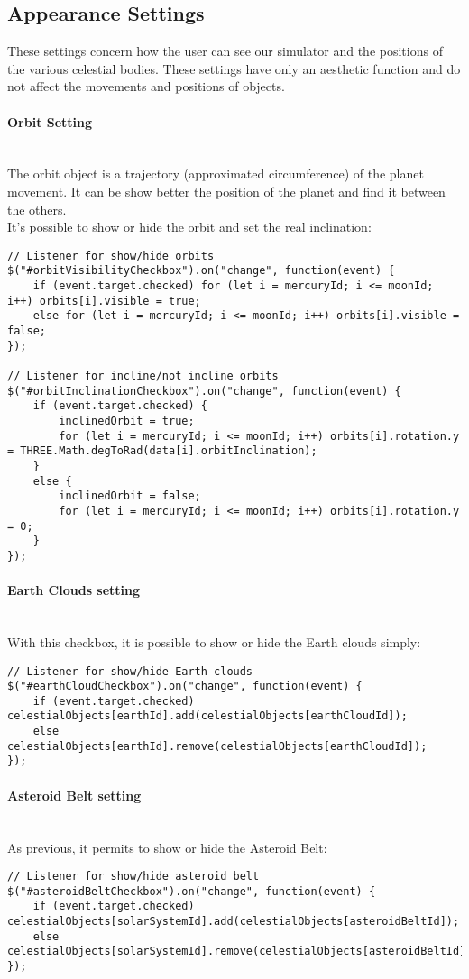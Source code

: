 \documentclass{article}
\begin{document}
\subsection{Appearance Settings}
These settings concern how the user can see our simulator and the positions of the various celestial bodies. These settings have only an aesthetic function and do not affect the movements and positions of objects.
\paragraph{Orbit Setting}\mbox{}\\
The orbit object is a trajectory (approximated circumference) of the planet movement. It can be show better the position of the planet and find it between the others.\\
It's possible to show or hide the orbit and set the real inclination:
\begin{lstlisting}
// Listener for show/hide orbits
$("#orbitVisibilityCheckbox").on("change", function(event) {
	if (event.target.checked) for (let i = mercuryId; i <= moonId; i++) orbits[i].visible = true;
	else for (let i = mercuryId; i <= moonId; i++) orbits[i].visible = false;
});

// Listener for incline/not incline orbits
$("#orbitInclinationCheckbox").on("change", function(event) {
	if (event.target.checked) {
		inclinedOrbit = true;
		for (let i = mercuryId; i <= moonId; i++) orbits[i].rotation.y = THREE.Math.degToRad(data[i].orbitInclination);
	}
	else {
		inclinedOrbit = false;
		for (let i = mercuryId; i <= moonId; i++) orbits[i].rotation.y = 0;
	}
});
\end{lstlisting}
\paragraph{Earth Clouds setting}\mbox{}\\
With this checkbox, it is possible to show or hide the Earth clouds simply:
\begin{lstlisting}
// Listener for show/hide Earth clouds
$("#earthCloudCheckbox").on("change", function(event) {
	if (event.target.checked) celestialObjects[earthId].add(celestialObjects[earthCloudId]);
	else celestialObjects[earthId].remove(celestialObjects[earthCloudId]);
});
\end{lstlisting}
\paragraph{Asteroid Belt setting}\mbox{}\\
As previous, it permits to show or hide the Asteroid Belt:
\begin{lstlisting}
// Listener for show/hide asteroid belt
$("#asteroidBeltCheckbox").on("change", function(event) {
	if (event.target.checked) celestialObjects[solarSystemId].add(celestialObjects[asteroidBeltId]);
	else celestialObjects[solarSystemId].remove(celestialObjects[asteroidBeltId]);
});
\end{lstlisting}
\end{document}
